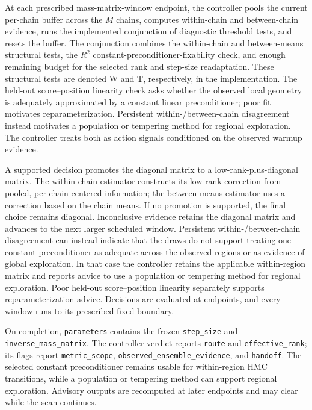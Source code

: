 \documentclass[11pt]{article}
\theoremstyle{plain}
\theoremstyle{definition}
\theoremstyle{remark}
\begin{document}
At each prescribed mass-matrix-window endpoint, the controller pools the
current per-chain buffer across the $M$ chains, computes within-chain and
between-chain evidence, runs the implemented conjunction of diagnostic
threshold tests, and resets the buffer. The conjunction combines the
within-chain and between-means structural tests, the $R^2$
constant-preconditioner-fixability check, and enough remaining budget for the
selected rank and step-size readaptation. These structural tests are denoted W
and T, respectively, in the implementation.
The held-out score--position linearity check asks whether the observed local
geometry is adequately approximated by a constant linear preconditioner; poor
fit motivates reparameterization. Persistent within-/between-chain
disagreement instead motivates a population or tempering method for regional
exploration. The controller treats both as action signals conditioned on the
observed warmup evidence.

A supported decision promotes the diagonal matrix to a
low-rank-plus-diagonal matrix. The within-chain estimator constructs its
low-rank correction from pooled, per-chain-centered information; the
between-means estimator uses a correction based on the chain means. If no
promotion is supported, the final choice remains diagonal. Inconclusive
evidence retains the diagonal matrix and advances to the next larger scheduled
window. Persistent within-/between-chain disagreement can instead indicate that
the draws do not support treating one constant preconditioner as adequate
across the observed regions or as evidence of global exploration. In that case
the controller retains the applicable within-region matrix and reports advice
to use a population or tempering method for regional exploration. Poor
held-out score--position linearity separately supports reparameterization advice.
Decisions are evaluated at endpoints, and every window runs to its prescribed
fixed boundary.

On completion, \nolinkurl{parameters} contains the frozen
\nolinkurl{step_size} and \nolinkurl{inverse_mass_matrix}. The controller
verdict reports \nolinkurl{route} and \nolinkurl{effective_rank}; its flags
report \nolinkurl{metric_scope}, \nolinkurl{observed_ensemble_evidence}, and
\nolinkurl{handoff}. The selected constant preconditioner remains usable for
within-region HMC transitions, while a population or tempering method can
support regional exploration. Advisory outputs are recomputed at later
endpoints and may clear while the scan continues.
\end{document}
